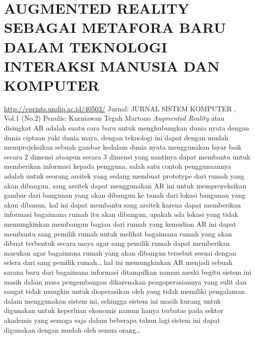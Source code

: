 \documentclass[a4paper, 12pt]{article}
\begin{document}
\section{AUGMENTED REALITY SEBAGAI METAFORA BARU DALAM TEKNOLOGI INTERAKSI MANUSIA DAN KOMPUTER}
\url{http://eprints.undip.ac.id/40503/}\newline
Jurnal: JURNAL SISTEM KOMPUTER , Vol.1 (No.2)\newline
Penulis: Kurniawan Teguh Martono\newline
\emph{Augmented Reality} atau disingkat AR adalah suatu cara baru untuk menghubungkan dunia nyata dengan dunia ciptaan yaki dunia maya, dengan teknologi ini dapat dengan mudah memprojeksikan sebuah gambar kedalam dunia nyata menggunakan layar baik secara 2 dimensi ataupun secara 3 dimensi yang nantinya dapat membantu untuk memberikan informasi kepada pengguna. salah satu contoh penggunaannya adalah untuk seorang arsitek yang sedang membuat prototype dari rumah yang akan dibangun, sang arsitek dapat menggunakan AR ini untuk memproyeksikan gambar dari bangunan yang akan dibangun ke tanah dari lokasi bangunan yang akan dibanun, hal ini dapat membantu sang arsitek karena dapat memberikan informasi bagaimana rumah itu akan dibangun, apakah ada lokasi yang tidak memungkinkan membangun bagian dari rumah yang kemudian AR ini dapat membantu sang pemilik rumah untuk melihat bagaimana rumah yang akan dibuat terbentuk secara maya agar sang pemilik rumah dapat memberikan masukan agar bagaimana rumah yang akan dibangun tersebut sesuai dengan selera dari sang pemilik rumah\dots\newline
hal ini memungkinkan AR menjadi sebuah sarana baru dari bagaimana informasi ditampilkan namun meski begitu sistem ini masih dalam masa pengembangan dikarenakan pengoperasiannya yang sulit dan sangat tidak mungkin untuk dioperasikan oleh yang tidak memiliki pengalaman dalam menggunakan sistem ini, sehingga sistem ini masih kurang untuk digunakan untuk keperluan ekonomis namun hanya terbatas pada sektor akademis yang semoga saja dalam beberapa tahun lagi sistem ini dapat digunakan dengan mudah oleh semua orang\dots
\end{document}
